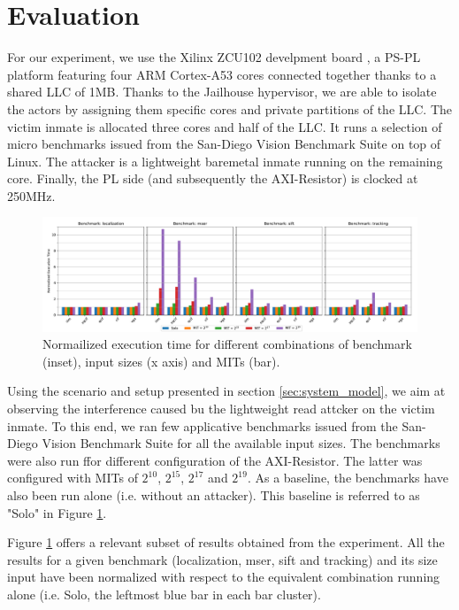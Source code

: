 \section{Evaluation}
    \label{sec:evaluation}
    For our experiment, we use the Xilinx ZCU102 develpment board \cite{Xilinx-ULTRASCALE-TRM}, a PS-PL platform featuring four ARM Cortex-A53 cores \cite{ARM-cortex-A53} connected together thanks to a shared LLC of 1MB.
    Thanks to the Jailhouse hypervisor, we are able to isolate the actors by assigning them specific cores and private partitions of the LLC.
    The victim inmate is allocated three cores and half of the LLC.
    It runs a selection of micro benchmarks issued from the San-Diego Vision Benchmark Suite \cite{SD-VBS} on top of Linux.
    The attacker is a lightweight baremetal inmate running on the remaining core.
    Finally, the PL side (and subsequently the AXI-Resistor) is clocked at 250MHz.

    \begin{figure}
        \centering
        \includegraphics[scale=0.425]{images/cpu-brainfreeze-interference.pdf}
        \caption{Normailized execution time for different combinations of benchmark (inset), input sizes (x axis) and MITs (bar).}
        \label{fig:cpu-brainfreeze-interference-results}
    \end{figure}

    Using the scenario and setup presented in section \ref{sec:system_model}, we aim at observing the interference caused bu the lightweight read attcker on the victim inmate. To this end, we ran few applicative benchmarks issued from the San-Diego Vision Benchmark Suite \cite{SD-VBS} for all the available input sizes. The benchmarks were also run ffor different configuration of the AXI-Resistor. The latter was configured with MITs of $2^{10}$, $2^{15}$, $2^{17}$ and $2^{19}$. As a baseline, the benchmarks have also been run alone (i.e. without an attacker). This baseline is referred to as "Solo" in Figure \ref{fig:cpu-brainfreeze-interference-results}.

    Figure \ref{fig:cpu-brainfreeze-interference-results} offers a relevant subset of results obtained from the experiment. All the results for a given benchmark (localization, mser, sift and tracking) and its size input have been normalized with respect to the equivalent combination running alone (i.e. Solo, the leftmost blue bar in each bar cluster).

